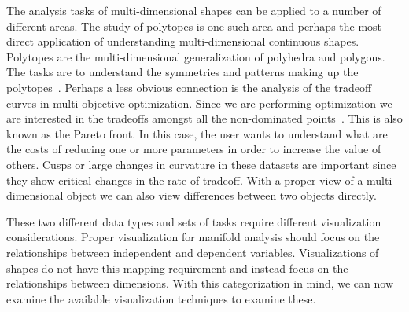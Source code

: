 The analysis tasks of multi-dimensional shapes can be applied to a number of
different areas. The study of polytopes is one such area and perhaps the most
direct application of understanding multi-dimensional continuous shapes.
Polytopes are the multi-dimensional generalization of polyhedra and polygons.
The tasks are to understand the symmetries and patterns making up the
polytopes~\cite{Ziegler:2012}. Perhaps a less obvious connection is the
analysis of the tradeoff curves in multi-objective optimization. Since we are
performing optimization we are interested in the tradeoffs amongst all the
non-dominated points~\cite{Kung:1975}. This is also known as the Pareto
front. In this case, the user wants to understand what are the costs of
reducing one or more parameters in order to increase the value of others. Cusps
or large changes in curvature in these datasets are important since they show
critical changes in the rate of tradeoff.  With a proper view of a
multi-dimensional object we can also view differences between two objects
directly. 

These two different data types and sets of tasks require different visualization
considerations. Proper visualization for manifold analysis should focus on
the relationships between independent and dependent variables. Visualizations
of shapes do not have this mapping requirement and instead focus on the 
relationships between dimensions. With this categorization in mind, we can now
examine the available visualization techniques to examine these.

